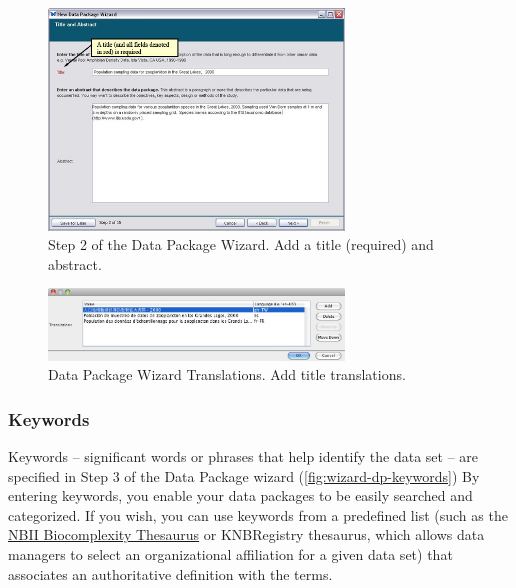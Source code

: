 \begin{figure}
  \centering
    \includegraphics[width=0.7\textwidth]{images/wizard-dp-title.jpg}
  \caption{Step 2 of the Data Package Wizard. Add a title (required) and
    abstract.}
  \label{fig:wizard-dp-title}
\end{figure}

\begin{figure}
  \centering
    \includegraphics[width=0.7\textwidth]{images/wizard-dp-title-translations.jpg}
  \caption{Data Package Wizard Translations. Add title translations.}
  \label{fig:wizard-dp-title-translations}
\end{figure}

\subsubsection{Keywords} \label{sec:wizard-dp-keywords}

Keywords -- significant words or phrases that help identify the data set
-- are specified in Step 3 of the Data Package wizard
(\autoref{fig:wizard-dp-keywords}) By entering keywords, you enable your
data packages to be easily searched and categorized. If you wish, you
can use keywords from a predefined list (such as the
\href{http://thesaurus.nbii.gov/portal/server.pt}{NBII Biocomplexity
Thesaurus} or KNBRegistry thesaurus, which allows data managers to
select an organizational affiliation for a given data set) that
associates an authoritative definition with the terms. 

